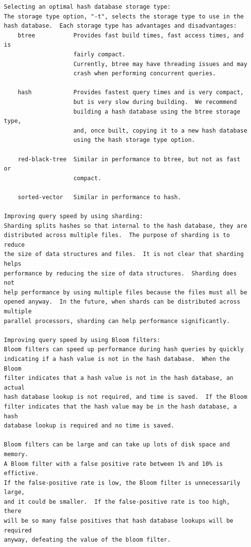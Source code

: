 \documentclass[11pt,twoside]{article}
\begin{document}
\begin{small}
\begin{verbatim}
Selecting an optimal hash database storage type:
The storage type option, "-t", selects the storage type to use in the
hash database.  Each storage type has advantages and disadvantages:
    btree           Provides fast build times, fast access times, and is
                    fairly compact.
                    Currently, btree may have threading issues and may
                    crash when performing concurrent queries.

    hash            Provides fastest query times and is very compact,
                    but is very slow during building.  We recommend
                    building a hash database using the btree storage type,
                    and, once built, copying it to a new hash database
                    using the hash storage type option.

    red-black-tree  Similar in performance to btree, but not as fast or
                    compact.

    sorted-vector   Similar in performance to hash.

Improving query speed by using sharding:
Sharding splits hashes so that internal to the hash database, they are
distributed across multiple files.  The purpose of sharding is to reduce
the size of data structures and files.  It is not clear that sharding helps
performance by reducing the size of data structures.  Sharding does not
help performance by using multiple files because the files must all be
opened anyway.  In the future, when shards can be distributed across multiple
parallel processors, sharding can help performance significantly.

Improving query speed by using Bloom filters:
Bloom filters can speed up performance during hash queries by quickly
indicating if a hash value is not in the hash database.  When the Bloom
filter indicates that a hash value is not in the hash database, an actual
hash database lookup is not required, and time is saved.  If the Bloom
filter indicates that the hash value may be in the hash database, a hash
database lookup is required and no time is saved.

Bloom filters can be large and can take up lots of disk space and memory.
A Bloom filter with a false positive rate between 1% and 10% is effictive.
If the false-positive rate is low, the Bloom filter is unnecessarily large,
and it could be smaller.  If the false-positive rate is too high, there
will be so many false positives that hash database lookups will be required
anyway, defeating the value of the bloom filter.


\end{verbatim}
\end{small}
\end{document}
